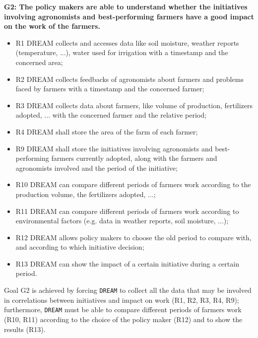 \documentclass{article}
\begin{document}
\vspace{5mm}
\textbf{G2: The policy makers are able to understand whether the initiatives involving agronomists and best-performing farmers have a good impact on the work of the farmers.}
\begin{itemize}
    \item R1 DREAM collects and accesses data like soil moisture, weather reports (temperature, ...), water used for irrigation with a timestamp and the concerned area;

    \item R2 DREAM collects feedbacks of agronomists about farmers and problems faced by farmers with a timestamp and the concerned farmer;

    \item R3 DREAM collects data about farmers, like volume of production, fertilizers adopted, ... with the concerned farmer and the relative period;

    \item R4 DREAM shall store the area of the farm of each farmer;

    \item R9 DREAM shall store the initiatives involving agronomists and best-performing farmers currently adopted, along with the farmers and agronomists involved and the period of the initiative;

    \item R10 DREAM can compare different periods of farmers work according to the production volume, the fertilizers adopted, ...;

    \item R11 DREAM can compare different periods of farmers work according to environmental factors (e.g. data in weather reports, soil moisture, ...);

    \item R12 DREAM allows policy makers to choose the old period to compare with, and according to which initiative decision;

    \item R13 DREAM can show the impact of a certain initiative during a certain period.
\end{itemize}
Goal G2 is achieved by forcing \verb|DREAM| to collect all the data that may be involved in correlations between initiatives and impact on work (R1, R2, R3, R4, R9); furthermore, \verb|DREAM| must be able to compare different periods of farmers work (R10, R11) according to the choice of the policy maker (R12) and to show the results (R13).
\end{document}
